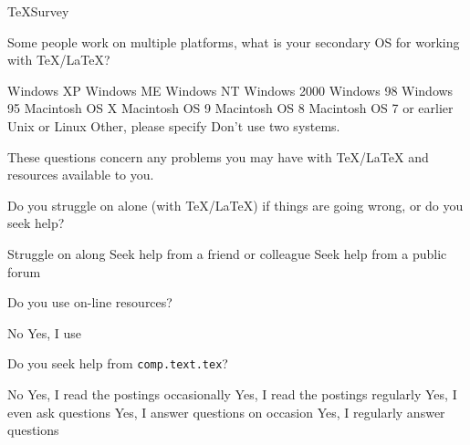 \documentclass{article}
\begin{document}
\begin{exam}{TeXSurvey}
\begin{problem*}
\begin{parts}
\item Some people work on multiple platforms, what is your secondary
OS for working with \TeX/\LaTeX?
\begin{multicols}{2}
\begin{answers}{1}
\bChoices
      Windows XP\eAns
      Windows ME\eAns
      Windows NT\eAns
      Windows 2000\eAns
      Windows 98\eAns
      Windows 95\eAns
      Macintosh OS X\eAns
      Macintosh OS 9\eAns
      Macintosh OS 8\eAns
      Macintosh OS 7 or earlier\eAns
      Unix or Linux\eAns
      Other, please specify \fillin{1.25in}{\empty}\eAns
      Don't use two systems.\eAns
\eChoices
\end{answers}
\end{multicols}

\end{parts}

\end{problem*}


\begin{eqComments}\end{eqComments}

\begin{problem*}
These questions concern any problems you may have with \TeX/\LaTeX{} and resources available to you.
\begin{parts}
\item  Do you struggle on alone (with \TeX/\LaTeX ) if things are going wrong, or do you
  seek help?
  \begin{answers}{3}
    \bChoices
         Struggle on along\eAns
         Seek help from a friend or colleague\eAns
         Seek help from a public forum\eAns
    \eChoices
  \end{answers}

\item Do you use on-line resources?
  \begin{answers}{4}
    \bChoices
         No\eAns
         Yes, I use \makebox[0pt][l]{\fillin{1.75in}{\empty}}\eAns
    \eChoices
  \end{answers}

\goodbreak

\item Do you seek help from \texttt{comp.text.tex}?
  \begin{answers}{3}
    \bChoices
         No\eAns
         Yes, I read the postings occasionally\eAns
         Yes, I read the postings regularly\eAns
         Yes, I even ask questions\eAns
         Yes, I answer questions on occasion\eAns
         Yes, I regularly answer questions\eAns
    \eChoices
  \end{answers}
\end{parts}
\end{problem*}


\end{exam}
\end{document}
